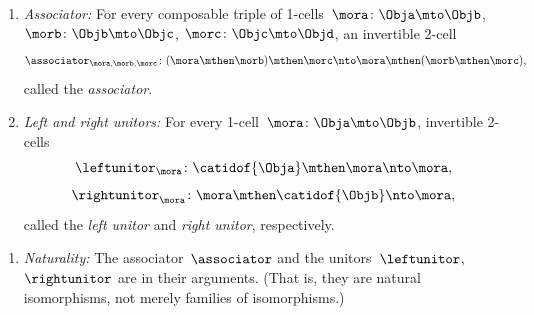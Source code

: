 \begin{ctdefinition}[Bicategory]
\begin{enumerate}
        \item \label{bicat-associator}
              \emph{Associator:}
              For every composable triple of 1-cells~$\mora\colon \Obja \mto \Objb$, $\morb\colon \Objb \mto \Objc$, $\morc\colon \Objc \mto \Objd$, an invertible 2-cell
              \begin{equation}\label{eq:bicat-associator}
                  \associator_{\mora,\morb,\morc} \colon (\mora \mthen \morb) \mthen \morc \nto \mora \mthen (\morb \mthen \morc),
              \end{equation}
              called the \emph{associator}.

        \item \label{bicat-unitors}
              \emph{Left and right unitors:}
              For every 1-cell~$\mora \colon \Obja \mto \Objb$, invertible 2-cells
              \begin{equation}\label{eq:bicat-left-unitor}
                  \leftunitor_\mora \colon \catidof{\Obja} \mthen \mora \nto \mora,
              \end{equation}
              \begin{equation}\label{eq:bicat-right-unitor}
                  \rightunitor_\mora \colon \mora \mthen \catidof{\Objb} \nto \mora,
              \end{equation}
              called the \emph{left unitor} and \emph{right unitor}, respectively.
    \end{enumerate}

    \condit

    \begin{enumerate}
        \item \label{bicat-naturality}
              \emph{Naturality:}
              The associator~$\associator$ and the unitors~$\leftunitor$,~$\rightunitor$ are  in their arguments.
              (That is, they are natural isomorphisms, not merely families of isomorphisms.)


\end{enumerate}
\end{ctdefinition}

